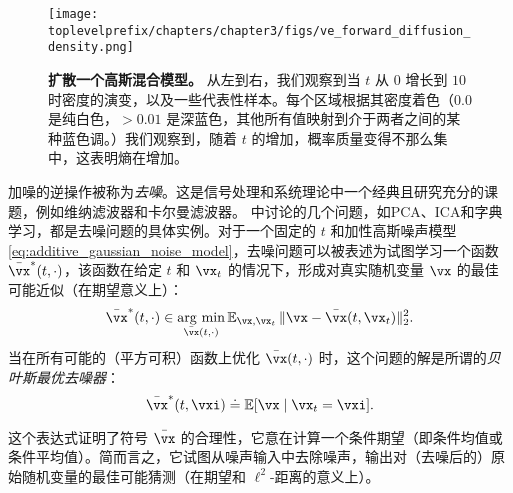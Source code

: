 \documentclass[../../book-main_zh.tex]{subfiles}
\begin{document}
\begin{figure}
	\texttt{[image: \\toplevelprefix/chapters/chapter3/figs/ve\_forward\_diffusion\_density.png]}
	\caption{\small\textbf{扩散一个高斯混合模型。} 从左到右，我们观察到当 \(t\) 从 \(0\) 增长到 \(10\) 时密度的演变，以及一些代表性样本。每个区域根据其密度着色（\(0.0\) 是纯白色，\(> 0.01\) 是深蓝色，其他所有值映射到介于两者之间的某种蓝色调。）我们观察到，随着 \(t\) 的增加，概率质量变得不那么集中，这表明熵在增加。}
	\label{fig:ve_forward_density}
\end{figure}

加噪的逆操作被称为\textit{去噪}。这是信号处理和系统理论中一个经典且研究充分的课题，例如维纳滤波器和卡尔曼滤波器。 中讨论的几个问题，如PCA、ICA和字典学习，都是去噪问题的具体实例。对于一个固定的 \(t\) 和加性高斯噪声模型 \eqref{eq:additive_gaussian_noise_model}，去噪问题可以被表述为试图学习一个函数 \(\bar{\vx}^{\ast}(t, \cdot)\)，该函数在给定 \(t\) 和 \(\vx_{t}\) 的情况下，形成对真实随机变量 \(\vx\) 的最佳可能近似（在期望意义上）：
\begin{equation}\label{eq:denoising_loss}
	\bar{\vx}^{\ast}(t, \cdot) \in \argmin_{\bar{\vx}(t, \cdot)}\Ex_{\vx, \vx_{t}}\norm{\vx - \bar{\vx}(t, \vx_{t})}_{2}^{2}.
\end{equation}
当在所有可能的（平方可积）函数上优化 \(\bar{\vx}(t, \cdot)\) 时，这个问题的解是所谓的\textit{贝叶斯最优去噪器}：
\begin{equation}\label{eq:optimal_denoiser}
	\bar{\vx}^{\ast}(t, \vxi) \doteq \Ex[\vx \mid \vx_{t} = \vxi].
\end{equation}

这个表达式证明了符号 \(\bar{\vx}\) 的合理性，它意在计算一个条件期望（即条件均值或条件平均值）。简而言之，它试图从噪声输入中去除噪声，输出对（去噪后的）原始随机变量的最佳可能猜测（在期望和 \(\ell^{2}\)-距离的意义上）。
\end{document}
